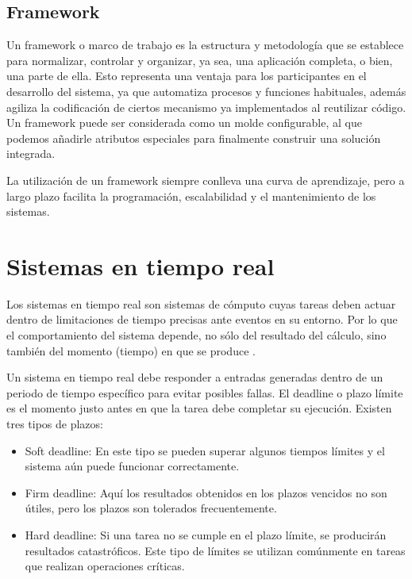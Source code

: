      \subsection{Framework}
Un framework o marco de trabajo es la estructura y metodología que se establece para normalizar, controlar y organizar, ya sea, una aplicación completa, o bien, una parte de ella. 
Esto representa una ventaja para los participantes en el desarrollo del sistema, ya que automatiza procesos y funciones habituales, además agiliza la codificación de ciertos mecanismo ya implementados al reutilizar código.
Un framework puede ser considerada como un molde configurable, al que podemos añadirle atributos especiales para finalmente construir una solución integrada.
\newline

La utilización de un framework siempre conlleva una curva de aprendizaje, pero a largo plazo facilita la programación, escalabilidad y el mantenimiento de los sistemas.
		
    \section{Sistemas en tiempo real}\label{sec:sistr}

    Los sistemas en tiempo real son sistemas de cómputo cuyas tareas deben actuar dentro de limitaciones de tiempo precisas ante eventos en su entorno. Por lo que el comportamiento del sistema depende, no sólo del resultado del cálculo, sino también del momento (tiempo) en que se produce \cite{Buta2011}.
    \newline 
    
    Un sistema en tiempo real debe  responder a entradas generadas dentro de un periodo de tiempo específico para evitar posibles fallas. El deadline o plazo límite es el momento justo antes en que la tarea debe completar su ejecución. Existen tres tipos de plazos: 
\begin{itemize}
\item Soft deadline: En este tipo se pueden superar algunos tiempos límites y el sistema aún puede funcionar correctamente.
\item Firm deadline: Aquí los resultados obtenidos en los plazos vencidos no son útiles, pero los plazos son tolerados frecuentemente.
\item Hard deadline: Si una tarea no se cumple en el plazo límite, se producirán resultados catastróficos. Este tipo de límites se utilizan comúnmente en tareas que realizan operaciones críticas.
\end{itemize}   


